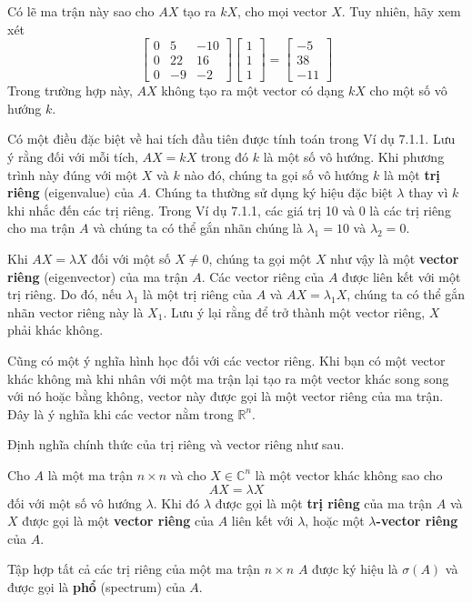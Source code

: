 Có lẽ ma trận này sao cho $AX$ tạo ra $kX$, cho mọi vector $X$. Tuy nhiên, hãy xem xét
\begin{equation*}
\begin{bmatrix}0&5&-10\\ 0&22&16\\ 0&-9&-2\end{bmatrix}\begin{bmatrix}1\\ 1\\ 1\end{bmatrix}=\begin{bmatrix}-5\\ 38\\ -11\end{bmatrix}
\end{equation*}
Trong trường hợp này, $AX$ không tạo ra một vector có dạng $kX$ cho một số vô hướng $k$.

Có một điều đặc biệt về hai tích đầu tiên được tính toán trong Ví dụ 7.1.1. Lưu ý rằng đối với mỗi tích, $AX=kX$ trong đó $k$ là một số vô hướng. Khi phương trình này đúng với một $X$ và $k$ nào đó, chúng ta gọi số vô hướng $k$ là một \textbf{trị riêng} (eigenvalue) của $A$. Chúng ta thường sử dụng ký hiệu đặc biệt $\lambda$ thay vì $k$ khi nhắc đến các trị riêng. Trong Ví dụ 7.1.1, các giá trị 10 và 0 là các trị riêng cho ma trận $A$ và chúng ta có thể gắn nhãn chúng là $\lambda_{1}=10$ và $\lambda_{2}=0$.

Khi $AX=\lambda X$ đối với một số $X\ne0$, chúng ta gọi một $X$ như vậy là một \textbf{vector riêng} (eigenvector) của ma trận $A$. Các vector riêng của $A$ được liên kết với một trị riêng. Do đó, nếu $\lambda_{1}$ là một trị riêng của $A$ và $AX=\lambda_{1}X$, chúng ta có thể gắn nhãn vector riêng này là $X_{1}$. Lưu ý lại rằng để trở thành một vector riêng, $X$ phải khác không.

Cũng có một ý nghĩa hình học đối với các vector riêng. Khi bạn có một vector khác không mà khi nhân với một ma trận lại tạo ra một vector khác song song với nó hoặc bằng không, vector này được gọi là một vector riêng của ma trận. Đây là ý nghĩa khi các vector nằm trong $\mathbb{R}^{n}$.

Định nghĩa chính thức của trị riêng và vector riêng như sau.

\begin{tcolorbox}[title={Định nghĩa: Trị riêng và Vector riêng}]
Cho $A$ là một ma trận $n\times n$ và cho $X\in\mathbb{C}^{n}$ là một vector khác không sao cho
\begin{equation}
AX=\lambda X
\end{equation}
đối với một số vô hướng $\lambda$. Khi đó $\lambda$ được gọi là một \textbf{trị riêng} của ma trận $A$ và $X$ được gọi là một \textbf{vector riêng} của $A$ liên kết với $\lambda$, hoặc một \textbf{$\lambda$-vector riêng} của $A$.

Tập hợp tất cả các trị riêng của một ma trận $n\times n$ $A$ được ký hiệu là $\sigma(A)$ và được gọi là \textbf{phổ} (spectrum) của $A$.
\end{tcolorbox}

